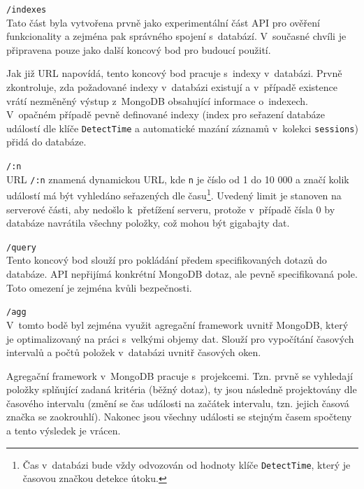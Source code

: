 \begin{description}
    \item \texttt{/indexes} \\
        Tato část byla vytvořena prvně jako experimentální část API pro ověření funkcionality a zejména pak správného spojení s~databází. V~současné chvíli je připravena pouze jako další koncový bod pro budoucí použití.

        Jak již URL napovídá, tento koncový bod pracuje s~indexy v~databázi. Prvně zkontroluje, zda požadované indexy v~databázi existují a v~případě existence vrátí nezměněný výstup z~MongoDB obsahující informace o~indexech. V~opačném případě pevně definované indexy (index pro seřazení databáze událostí dle klíče \texttt{DetectTime} a automatické mazání záznamů v~kolekci \texttt{sessions}) přidá do databáze.
        
    \item \texttt{/:n}\\
        URL \texttt{/:n} znamená dynamickou URL, kde \texttt{n} je číslo od 1 do 10 000 a značí kolik událostí má být vyhledáno seřazených dle času\footnote{Čas v~databázi bude vždy odvozován od hodnoty klíče \texttt{DetectTime}, který je časovou značkou detekce útoku.}. Uvedený limit je stanoven na serverové části, aby nedošlo k~přetížení serveru, protože v~případě čísla 0 by databáze navrátila všechny položky, což mohou být gigabajty dat.

    \item \texttt{/query}\\
        Tento koncový bod slouží pro pokládání předem specifikovaných dotazů do databáze. API nepřijímá konkrétní MongoDB dotaz, ale pevně specifikovaná pole. Toto omezení je zejména kvůli bezpečnosti. 

    \item \texttt{/agg}\\
        V~tomto bodě byl zejména využit agregační framework uvnitř MongoDB, který je optimalizovaný na práci s~velkými objemy dat. Slouží pro vypočítání časových intervalů a počtů položek v~databázi uvnitř časových oken.

        Agregační framework v~MongoDB pracuje s~projekcemi. Tzn. prvně se vyhledají položky splňující zadaná kritéria (běžný dotaz), ty jsou následně projektovány dle časového intervalu (změní se čas události na začátek intervalu, tzn. jejich časová značka se zaokrouhlí). Nakonec jsou všechny události se stejným časem spočteny a tento výsledek je vrácen.


\end{description}
